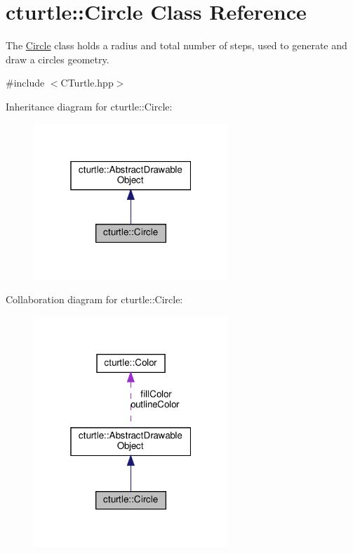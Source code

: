 \hypertarget{classcturtle_1_1Circle}{}\section{cturtle\+:\+:Circle Class Reference}
\label{classcturtle_1_1Circle}


The \hyperlink{classcturtle_1_1Circle}{Circle} class holds a radius and total number of steps, used to generate and draw a circles geometry.  




{\ttfamily \#include $<$C\+Turtle.\+hpp$>$}



Inheritance diagram for cturtle\+:\+:Circle\+:
\nopagebreak
\begin{figure}[H]
\begin{center}
\leavevmode
\includegraphics[width=208pt]{classcturtle_1_1Circle__inherit__graph}
\end{center}
\end{figure}


Collaboration diagram for cturtle\+:\+:Circle\+:
\nopagebreak
\begin{figure}[H]
\begin{center}
\leavevmode
\includegraphics[width=208pt]{classcturtle_1_1Circle__coll__graph}
\end{center}
\end{figure}
